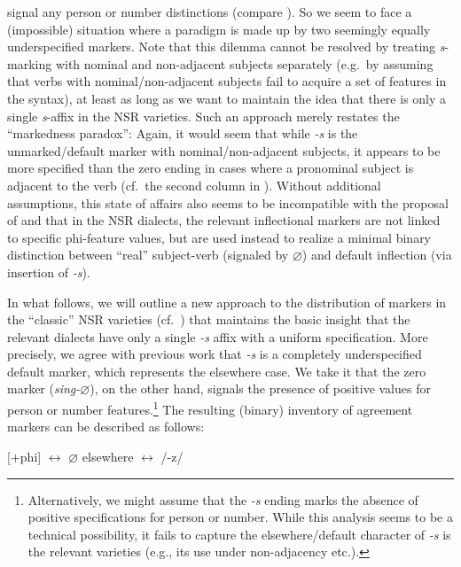 \documentclass[output=paper]{langsci/langscibook}
\begin{document}
signal any person or number distinctions (compare ). So
we seem to face a (impossible) situation where a paradigm is made up by two
seemingly equally underspecified markers. Note that this dilemma cannot be
resolved by treating \emph{s}-marking with nominal and non-adjacent subjects
separately (e.g.\ by assuming that verbs with nominal/non-adjacent subjects fail
to acquire a set of  features in the syntax), at least as long as we
want to maintain the idea that there is only a single \emph{s}-affix in the
\gls{NSR} varieties. Such an approach merely restates the ``markedness
paradox'': Again, it would seem that while \emph{-s} is the unmarked/default
marker with nominal/non-adjacent subjects, it appears to be more specified than
the zero ending in cases where a pronominal subject is adjacent to the verb
(cf.\ the second column in ). Without additional assumptions,
this state of affairs also seems to be incompatible with the proposal of
\textcite{deHaas:2011} and \textcite{deHaasandvanKemenade:2015} that in the
\gls{NSR} dialects, the relevant inflectional markers are not linked to
specific phi-feature values, but are used instead to realize a minimal binary
distinction between ``real'' subject-verb  (signaled by $\varnothing$) and default
inflection (via insertion of \emph{-s}).\largerpage

In what follows, we will outline a new approach to the distribution of markers
in the ``classic'' \gls{NSR} varieties (cf.\ ) that maintains the basic
insight that the relevant dialects have only a single \emph{-s} affix with a
uniform specification. More precisely, we agree with previous work that
\emph{-s} is a completely underspecified default marker, which represents the
elsewhere case. We take it that the zero marker (\emph{sing-$\varnothing$}), on the
other hand, signals the presence of positive values for person or number
features.\footnote{Alternatively, we might assume that the \emph{-s} ending
    marks the absence of positive specifications for person or number. While this
    analysis seems to be a technical possibility, it fails to capture the
    elsewhere/default character of \emph{-s} is the relevant varieties
(e.g., its use under non-adjacency etc.).} The resulting (binary) inventory of
agreement markers can be described as follows:

\ea\label{ex:10:5}
\ea \mbox{[$+$phi]} $\leftrightarrow$ $\varnothing$
\ex elsewhere $\leftrightarrow$ /-z/
\z
\z
\end{document}
